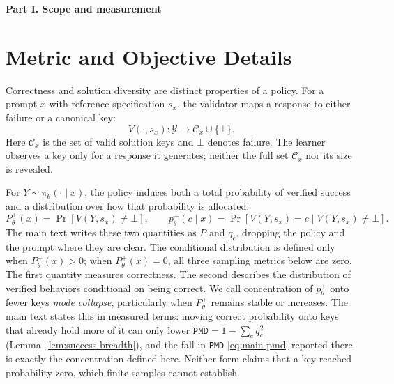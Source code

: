 \documentclass{article}
\newcommand{\1}{\mathbf 1}
\newcommand{\pmd}{\texttt{PMD}}
\theoremstyle{remark}
\theoremstyle{definition}
\theoremstyle{plain}
\begin{document}
\par\endgroup


\clearpage
{}
\begin{center}\large\textbf{Part I. Scope and measurement}\end{center}

\section{Metric and Objective Details}
\label{app:metric-details}


Correctness and solution diversity are distinct properties of a policy. For a
prompt $x$ with reference specification $s_x$, the validator maps a response
to either failure or a canonical key:
\[
  V(\cdot,s_x):\mathcal Y\rightarrow \mathcal C_x\cup\{\bot\}.
\]
Here $\mathcal C_x$ is the set of valid solution keys and $\bot$ denotes
failure. The learner observes a key only for a response it generates; neither
the full set $\mathcal C_x$ nor its size is revealed.

For $Y\sim\pi_\theta(\cdot\mid x)$, the policy induces both a total probability
of verified success and a distribution over how that probability is allocated:
\[
 P_\theta^+(x)=\Pr[V(Y,s_x)\neq\bot],
 \qquad
 p_\theta^+(c\mid x)=\Pr[V(Y,s_x)=c\mid V(Y,s_x)\neq\bot].
\]
The main text writes these two quantities as $P$ and $q_c$, dropping the
policy and the prompt where they are clear.
The conditional distribution is defined only when $P_\theta^+(x)>0$;
when $P_\theta^+(x)=0$, all three sampling metrics below are zero.
The first quantity measures correctness. The second describes the distribution
of verified behaviors conditional on being correct. We call concentration of
$p_\theta^+$ onto fewer keys \emph{mode collapse}, particularly when
$P_\theta^+$ remains stable or increases.
The main text states this in measured terms: moving correct probability onto
keys that already hold more of it can only lower
$\pmd{}=1-\sum_c q_c^2$ (Lemma~\ref{lem:success-breadth}), and the fall in \pmd{} \eqref{eq:main-pmd} reported
there is exactly the concentration defined here. Neither form claims that a key
reached probability zero, which finite samples cannot establish.
\end{document}
